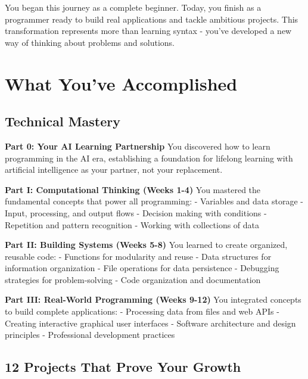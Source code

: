 \documentclass[
  letterpaper,
  DIV=11,
  numbers=noendperiod,
  oneside]{scrreprt}
\begin{document}
You began this journey as a complete beginner. Today, you finish as a
programmer ready to build real applications and tackle ambitious
projects. This transformation represents more than learning syntax -
you've developed a new way of thinking about problems and solutions.

\section{What You've Accomplished}\label{what-youve-accomplished}

\subsection{Technical Mastery}\label{technical-mastery}

\textbf{Part 0: Your AI Learning Partnership} You discovered how to
learn programming in the AI era, establishing a foundation for lifelong
learning with artificial intelligence as your partner, not your
replacement.

\textbf{Part I: Computational Thinking (Weeks 1-4)} You mastered the
fundamental concepts that power all programming: - Variables and data
storage - Input, processing, and output flows - Decision making with
conditions - Repetition and pattern recognition - Working with
collections of data

\textbf{Part II: Building Systems (Weeks 5-8)} You learned to create
organized, reusable code: - Functions for modularity and reuse - Data
structures for information organization - File operations for data
persistence - Debugging strategies for problem-solving - Code
organization and documentation

\textbf{Part III: Real-World Programming (Weeks 9-12)} You integrated
concepts to build complete applications: - Processing data from files
and web APIs - Creating interactive graphical user interfaces - Software
architecture and design principles - Professional development practices

\subsection{12 Projects That Prove Your
Growth}\label{projects-that-prove-your-growth}
\end{document}
